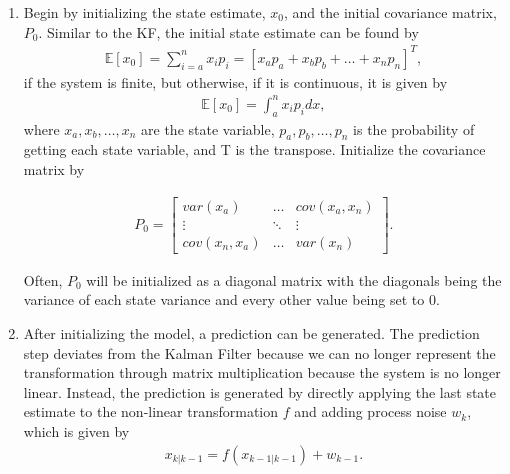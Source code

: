 \begin{enumerate}
  \item Begin by initializing the state estimate, $x_0$, and the initial covariance matrix, $P_0$. Similar to the KF, the initial state estimate can be found by 
  \begin{align*}
           \mathbb{E}[x_0]   = \sum^n_{i = a} x_i p_i = [x_a p_a + x_b p_b + \hdots + x_n p_n]^T,
      \end{align*}
      if the system is finite, but otherwise, if it is continuous, it is given by
          \begin{align*}
        \mathbb{E}[x_0]   = \int^n_{a} x_i p_i  dx,
    \end{align*}
 \noindent where  $x_a, x_b, \hdots, x_n$ are the state variable, $p_a, p_b, \hdots, p_n$ is the probability of getting each state variable, and T is the transpose. Initialize the covariance matrix by
    
  \begin{align*}
      P_0 =
      \begin{bmatrix}
           var(x_a)  & \hdots & cov(x_a,x_n) \\
           \vdots & \ddots & \vdots \\
           cov(x_n, x_a)  & \hdots & var(x_n )
         \end{bmatrix} .
  \end{align*}  
  
  Often, $P_0 $ will be initialized as a diagonal matrix with the diagonals being the variance of each state variance and every other value being set to 0.
  
  \item After initializing the model, a prediction can be generated. The prediction step deviates from the Kalman Filter because we can no longer represent the transformation through matrix multiplication because the system is no longer linear. Instead, the prediction is generated by directly applying the last state estimate to the non-linear transformation $f$ and adding process noise $w_k$, which is given by
  \begin{align*}
      x_{k|k-1} = f( x_{k-1|k-1} ) + w_{k-1}.
  \end{align*} 
  

\end{enumerate}
